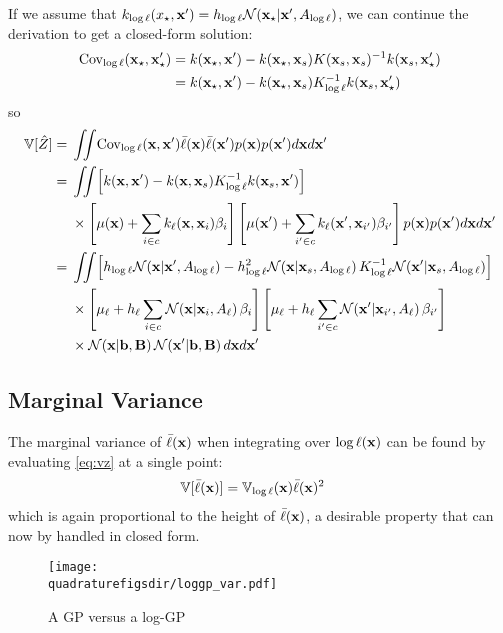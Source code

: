 If we assume that $k_{\log \ell}(x_\star, {\bf{x}}') = h_{\log \ell}\mathcal{N}\!\left({\bf{x}}_\star \middle| {\bf{x}}',A_{\log \ell}\right)$, we can continue the derivation to get a closed-form solution:
\begin{align}
\textrm{Cov}_{{\log \ell}}({\bf{x}}_\star, {\bf{x}}_\star') & = k( {\bf{x}}_\star, {\bf{x}}' ) - k( {\bf{x}}_\star, {\bf{x}}_s ) K({\bf{x}}_s, {\bf{x}}_s)^{-1} k( {\bf{x}}_s, {\bf{x}}_\star' ) \\
& = k( {\bf{x}}_\star, {\bf{x}}' ) - k( {\bf{x}}_\star, {\bf{x}}_s ) K_{{\log \ell}}^{-1} k( {\bf{x}}_s, {\bf{x}}_\star' )
\end{align}
so
\begin{align}
\var[\hat Z] = {} & \int\!\!\! \int\! \textrm{Cov}_{\lftwo}(\vx, \vx') \mftwo(\vx) \mftwo(\vx') p(\vx) p(\vx') d\vx d\vx' \\
= {} & \int\!\!\! \int\! \left[k( \vx, \vx' ) - k( \vx, \vx_s ) K_{\lftwo}^{-1} k( \vx_s, \vx' ) \right] \\ 
& \times \left[\mu(\vx) + \sum_{i \in c} k_\ell(\vx, \vx_i) \beta_i \right] \left[\mu(\vx') + \sum_{i' \in c} k_\ell(\vx', \vx_{i'}) \beta_{i'} \right] p(\vx) p(\vx') d\vx d\vx' \\
= {} & \int\!\!\! \int\! \left[ h_\lftwo \N{\vx}{\vx'}{A_\lftwo} - h_\lftwo^2 \N{\vx}{\vx_s}{A_\lftwo} K_{\lftwo}^{-1} \N{\vx'}{\vx_s}{A_\lftwo} \right] \\ 
& \times \left[\mu_\ell + h_\ell \sum_{i \in c} \N{\vx}{\vx_i}{A_\ell} \beta_i \right] \left[\mu_\ell + h_\ell \sum_{i' \in c} \N{\vx'}{\vx_{i'}}{A_\ell} \beta_{i'} \right] \\
& \times \N{\vx}{\vb}{\vB} \N{\vx'}{\vb}{\vB} d\vx d\vx'
\end{align}


\subsection{Marginal Variance}

The marginal variance of ${\bar \ell}({\bf{x}})$ when integrating over ${\log \ell}({\bf{x}})$ can be found by evaluating \eqref{eq:vz} at a single point:
%
\begin{align}
\mathbb{V}[{\bar \ell}({\bf{x}})] & = \mathbb{V}_{\log \ell}({\bf{x}}) {\bar \ell}({\bf{x}})^2
\label{eq:vz}
\end{align}
%
which is again proportional to the height of ${\bar \ell}({\bf{x}})$, a desirable property that can now by handled in closed form.

\begin{figure}
\centering
\texttt{[image: \\quadraturefigsdir/loggp\_var.pdf]}
\caption[Comparing the differing characteristics of \sgp{} ans log-\sgp{} models]
{A GP versus a log-GP}
\label{fig:loggp}
\end{figure}




